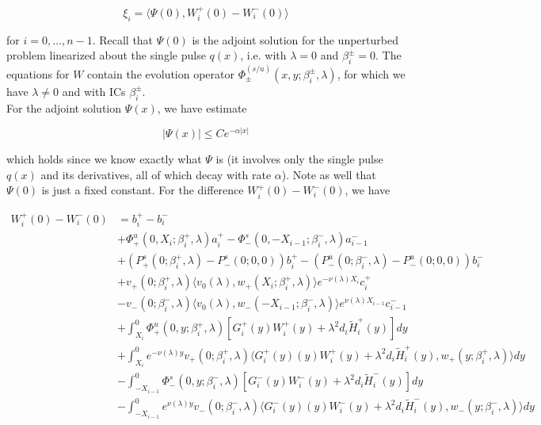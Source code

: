 \documentclass[12pt]{article}
\begin{document}
\begin{equation}
\xi_i = \langle \Psi(0), W_i^+(0) - W_i^-(0) \rangle 
\end{equation}

for $i = 0, \dots, n-1$. Recall that $\Psi(0)$ is the adjoint solution for the unperturbed problem linearized about the single pulse $q(x)$, i.e. with $\lambda = 0$ and $\beta_i^\pm = 0$. The equations for $W$ contain the evolution operator $\Phi^{(s/u)}_\pm(x, y; \beta_i^\pm, \lambda)$, for which we have $\lambda \neq 0$ and with ICs $\beta_i^\pm$.\\

For the adjoint solution $\Psi(x)$, we have estimate 

\begin{equation}
|\Psi(x)| \leq C e^{-\alpha|x|}
\end{equation}

which holds since we know exactly what $\Psi$ is (it involves only the single pulse $q(x)$ and its derivatives, all of which decay with rate $\alpha$). Note as well that $\Psi(0)$ is just a fixed constant. For the difference $W_i^+(0) - W_i^-(0)$, we have

\begin{align*}
W_i^+(0) - W_i^-(0) &= b_i^+ - b_i^- \\
&+ \Phi^u_+(0, X_i; \beta_i^+, \lambda)a_i^+ - \Phi^s_-(0, -X_{i-1}; \beta_i^-, \lambda)a_{i-1}^- \\
&+(P^s_+(0; \beta_i^+, \lambda) - P^s_-(0; 0, 0))b_i^+  - (P^u_-(0; \beta_i^-, \lambda) - P^u_-(0; 0, 0))b_i^- \\
&+ v_+(0; \beta_i^+, \lambda) \langle v_0(\lambda), w_+(X_i; \beta_i^+, \lambda) \rangle e^{-\nu(\lambda)X_i} c_i^+ \\
&- v_-(0; \beta_i^-, \lambda) \langle v_0(\lambda), w_-(-X_{i-1}; \beta_i^-, \lambda) \rangle e^{\nu(\lambda)X_{i-1}} c_{i-1}^- \\
&+ \int_{X_i}^0 \Phi^u_+(0, y; \beta_i^+, \lambda) [ G_i^+(y)W_i^+(y) + \lambda^2 d_i \tilde{H}_i^+(y) ] dy \\
&+ \int_{X_i}^0 e^{-\nu(\lambda)y} v_+(0; \beta_i^+, \lambda) \langle G_i^+(y)(y)W_i^+(y) + \lambda^2 d_i \tilde{H}_i^+(y), w_+(y; \beta_i^+, \lambda) \rangle dy \\
&- \int_{-X_{i-1}}^0 \Phi^s_-(0, y; \beta_i^-, \lambda) [ G_i^-(y)W_i^-(y) + \lambda^2 d_i \tilde{H}_i^-(y) ] dy \\
&- \int_{-X_{i-1}}^0
e^{\nu(\lambda)y} v_-(0; \beta_i^-, \lambda) \langle G_i^-(y)(y)W_i^-(y) + \lambda^2 d_i \tilde{H}_i^-(y), w_-(y; \beta_i^-, \lambda) \rangle dy \\
\end{align*}
\end{document}
